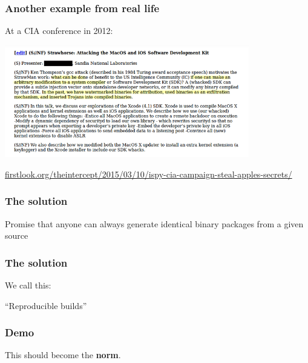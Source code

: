 \documentclass[14pt]{beamer}
\begin{document}
\begin{frame}[fragile]
 \frametitle{Another example from real life}

 At a CIA conference in 2012:
 \begin{center}
  \includegraphics[width=0.8\textwidth]{images/strawhorse.png}

  {\footnotesize
  \url{firstlook.org/theintercept/2015/03/10/ispy-cia-campaign-steal-apples-secrets/}
  }
 \end{center}
\end{frame}


\begin{frame}
 \frametitle{The solution}

 \begin{center}
 \Large{
 Promise that anyone can always generate
 identical binary packages
 from a given source}
\end{center}
\end{frame}


\begin{frame}
 \frametitle{The solution}

 \begin{center}
 We call this:

 \Huge{ “Reproducible builds” }
 \end{center}
\end{frame}

\begin{frame}
 \frametitle{Demo}
%
%
\end{frame}

\begin{frame}[plain]
\begin{center}
 \Huge{This should become the \textbf{norm}.}

\end{center}
\end{frame}
\end{document}
